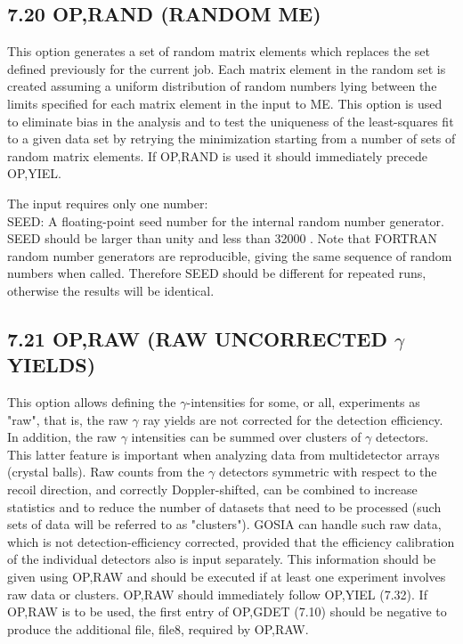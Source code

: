 \documentclass[10pt]{article}
\begin{document}
\subsection*{7.20 OP,RAND (RANDOM ME)}
This option generates a set of random matrix elements which replaces the set defined previously for the current job. Each matrix element in the random set is created assuming a uniform distribution of random numbers lying between the limits specified for each matrix element in the input to ME. This option is used to eliminate bias in the analysis and to test the uniqueness of the least-squares fit to a given data set by retrying the minimization starting from a number of sets of random matrix elements. If OP,RAND is used it should immediately precede OP,YIEL.

The input requires only one number:\\
SEED: A floating-point seed number for the internal random number generator. SEED should be larger than unity and less than 32000 . Note that FORTRAN random number generators are reproducible, giving the same sequence of random numbers when called. Therefore SEED should be different for repeated runs, otherwise the results will be identical.

\subsection*{7.21 OP,RAW (RAW UNCORRECTED $\gamma$ YIELDS)}
This option allows defining the $\gamma$-intensities for some, or all, experiments as "raw", that is, the raw $\gamma$ ray yields are not corrected for the detection efficiency. In addition, the raw $\gamma$ intensities can be summed over clusters of $\gamma$ detectors. This latter feature is important when analyzing data from multidetector arrays (crystal balls). Raw counts from the $\gamma$ detectors symmetric with respect to the recoil direction, and correctly Doppler-shifted, can be combined to increase statistics and to reduce the number of datasets that need to be processed (such sets of data will be referred to as "clusters"). GOSIA can handle such raw data, which is not detection-efficiency corrected, provided that the efficiency calibration of the individual detectors also is input separately. This information should be given using OP,RAW and should be executed if at least one experiment involves raw data or clusters. OP,RAW should immediately follow OP,YIEL (7.32). If OP,RAW is to be used, the first entry of OP,GDET (7.10) should be negative to produce the additional file, file8, required by OP,RAW.
\end{document}
